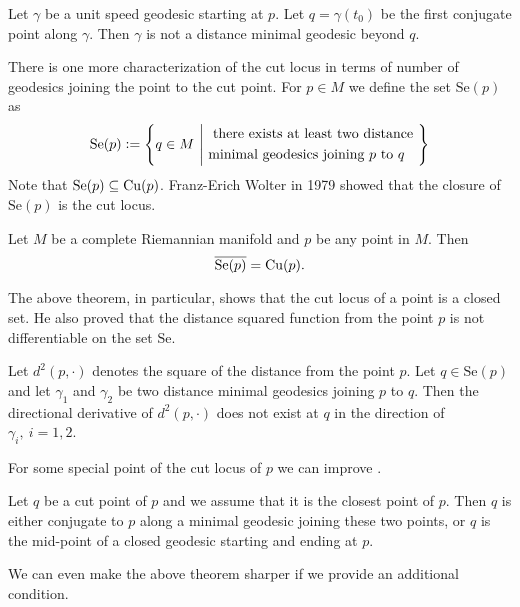 \begin{thm}\cite[Theorem 4.1]{Kob67}
    Let $\gamma$ be a unit speed geodesic starting at $p$. Let $q=\gamma(t_0)$ be the first conjugate point along $\gamma$. Then $\gamma$ is not a distance minimal geodesic beyond $q$.
\end{thm}

\vspace{0.3cm}
\noindent There is one more characterization of the cut locus in terms of number of geodesics joining the point to the cut point. For $p\in M$ we define the set $\mathrm{Se}(p)$ as 
\begin{equation}\label{eq:SeSetofPoint}
    \mathrm{Se}(p) \defeq
    \left\{q\in M ~\middle|~
        \begin{aligned}
            & \text{ there exists at least two distance }\\
            & \text{minimal geodesics joining $p$ to $q$}
        \end{aligned}
    \right\}
\end{equation}
Note that $\mathrm{Se}(p)\subseteq \cutn[p]$. Franz-Erich Wolter in 1979 showed that the closure of $\mathrm{Se}(p)$ is the cut locus. 
\begin{thm}\cite[Theorem 1]{Wol79}\label{thm:ClosureOfSeisCup}
    Let $M$ be a complete Riemannian manifold and $p$ be any point in $M$. Then 
    \begin{displaymath}
        \overline{\mathrm{Se}(p)} = \cutn[p].
    \end{displaymath}
\end{thm} 
\bigskip
The above theorem, in particular, shows that the cut locus of a point is a closed set. He also proved that the distance squared function from the point $p$ is not differentiable on the set $\mathrm{Se}$.
\begin{thm}\cite[Lemma 1]{Wol79}
    Let $d^2(p,\cdot)$ denotes the square of the distance from the point $p$. Let $q\in \mathrm{Se}(p)$ and let $\gamma_1$ and $\gamma_2$ be two distance minimal geodesics joining $p$ to $q$. Then the directional derivative of $d^2(p,\cdot)$ does not exist at $q$ in the direction of $\gamma_i,~i=1,2$.
\end{thm}
\bigskip 
\noindent For some special point of the cut locus of $p$ we can improve .
\begin{thm}\cite[Theorem 4.4]{Kob67}\label{thm:ExistenseOfClosedGeodesic-1}
    Let $q$ be a cut point of $p$ and we assume that it is the closest point of $p$. Then $q$ is either conjugate to $p$ along a minimal geodesic joining these two points, or $q$ is the mid-point of a closed geodesic starting and ending at $p$.
\end{thm}
\bigskip 
We can even make the above theorem sharper if we provide an additional condition. 

